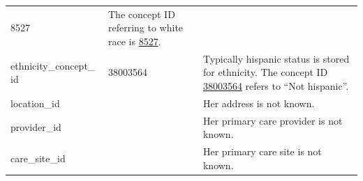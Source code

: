 \documentclass[11pt]{book}
\begin{document}
\begin{longtable}[]{@{}lll@{}}
\begin{minipage}[t]{0.16\columnwidth}
8527\strut
\end{minipage} & \begin{minipage}[t]{0.48\columnwidth}\raggedright\strut
The concept ID referring to white race is
\href{http://athena.ohdsi.org/search-terms/terms/8527}{8527}.\strut
\end{minipage}\tabularnewline
\begin{minipage}[t]{0.28\columnwidth}\raggedright\strut
ethnicity\_concept\_ id\strut
\end{minipage} & \begin{minipage}[t]{0.16\columnwidth}\raggedright\strut
38003564\strut
\end{minipage} & \begin{minipage}[t]{0.48\columnwidth}\raggedright\strut
Typically hispanic status is stored for ethnicity. The concept ID
\href{http://athena.ohdsi.org/search-terms/terms/38003564}{38003564}
refers to ``Not hispanic''.\strut
\end{minipage}\tabularnewline
\begin{minipage}[t]{0.28\columnwidth}\raggedright\strut
location\_id\strut
\end{minipage} & \begin{minipage}[t]{0.16\columnwidth}\raggedright\strut
\strut
\end{minipage} & \begin{minipage}[t]{0.48\columnwidth}\raggedright\strut
Her address is not known.\strut
\end{minipage}\tabularnewline
\begin{minipage}[t]{0.28\columnwidth}\raggedright\strut
provider\_id\strut
\end{minipage} & \begin{minipage}[t]{0.16\columnwidth}\raggedright\strut
\strut
\end{minipage} & \begin{minipage}[t]{0.48\columnwidth}\raggedright\strut
Her primary care provider is not known.\strut
\end{minipage}\tabularnewline
\begin{minipage}[t]{0.28\columnwidth}\raggedright\strut
care\_site\_id\strut
\end{minipage} & \begin{minipage}[t]{0.16\columnwidth}\raggedright\strut
\strut
\end{minipage} & \begin{minipage}[t]{0.48\columnwidth}\raggedright\strut
Her primary care site is not known.\strut
\end{minipage}\tabularnewline

\end{longtable}
\end{document}
